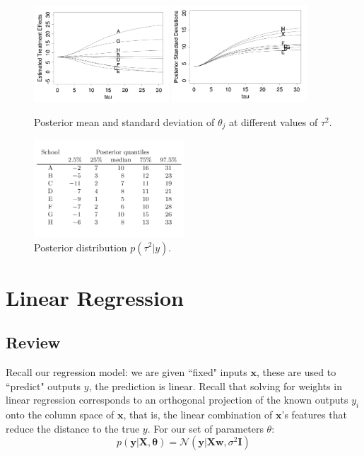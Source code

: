 \documentclass{harvardml}
\theoremstyle{definition}
\theoremstyle{plain}
\renewcommand{\v}[1]{\mathbf{#1}}
\begin{document}
\begin{figure}[!hbt]
\center
\includegraphics[width=0.45\textwidth]{8school_post_mean.pdf}
\includegraphics[width=0.45\textwidth]{8school_post_sd.pdf}
\caption{Posterior mean and standard deviation of $\theta_j$ at different values of $\tau^2$.}
\end{figure}

\begin{figure}[!hbt]
\center
\includegraphics[width=0.5\textwidth]{8school_post_table.pdf}
\caption{Posterior distribution $p(\tau^2|y)$.}
\end{figure}

\clearpage
\section{Linear Regression}
\subsection{Review}

\noindent Recall our regression model: we are given ``fixed" inputs $\v x$,
these are used to ``predict" outputs $y$, the prediction is linear. Recall that solving for weights in linear regression corresponds to an orthogonal
projection of the known outputs $y_i$ onto the column space of $\v x$,
that is, the linear combination of $\v x$'s features that reduce the 
distance to the true $y$. For our set of parameters $\theta$:
$$ p(\v y | \v X, \v \theta) = \mathcal{N}(\v y | \v X \v w, \sigma^2 \v I) $$
\end{document}

